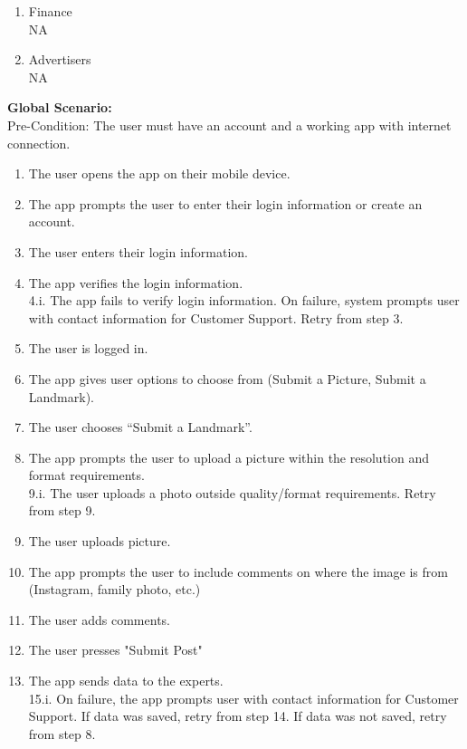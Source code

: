 \documentclass[]{article}
\begin{document}
\begin{enumerate}[{\bf BE1.}]
\begin{enumerate}[{\bf VP1.}]
            \item Finance \\
            NA
            \item Advertisers\\
            NA \\
		\end{enumerate}
		{\bf Global Scenario:}\\
            Pre-Condition: The user must have an account and a working app with internet connection. 
		      \begin{enumerate}[{1.}]
                    \item The user opens the app on their mobile device.
                        \item The app prompts the user to enter their login information or create an account.
                        \item The user enters their login information.
                        \item The app verifies the login information. \\ 4.i. The app fails to verify login information. On failure, system prompts user with contact information for Customer Support. Retry from step 3.
                        \item The user is logged in.
                        \item The app gives user options to choose from (Submit a Picture, Submit a Landmark). 
                        \item The user chooses “Submit a Landmark”. 
                        \item The app prompts the user to upload a picture within the resolution and format requirements. \\ 9.i. The user uploads a photo outside quality/format requirements. Retry from step 9.\\
                        \item The user uploads picture.
                        \item The app prompts the user to include comments on where the image is from (Instagram, family photo, etc.) 
                        \item The user adds comments.
                        \item The user presses "Submit Post"
                        \item The app sends data to the experts. \\ 15.i. On failure, the app prompts user with contact information for Customer Support. If data was saved, retry from step 14. If data was not saved, retry from step 8. 

\end{enumerate}
\end{enumerate}
\end{document}
